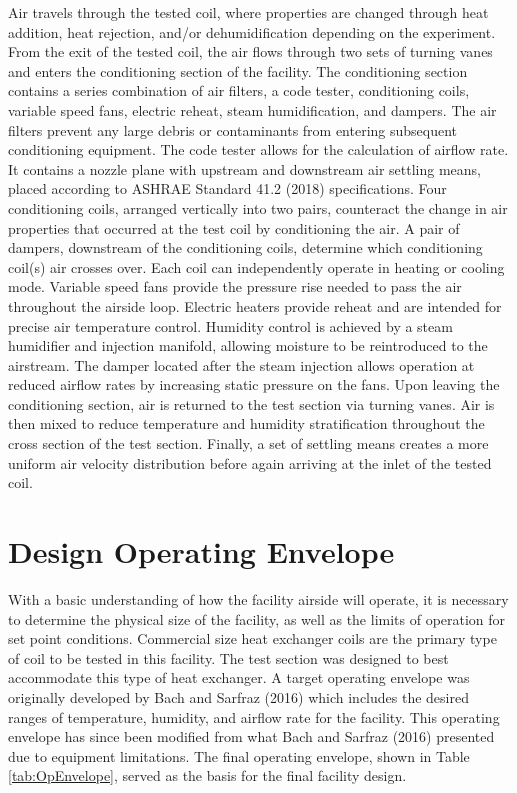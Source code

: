 Air travels through the tested coil, where properties are changed through heat addition, heat rejection, and/or dehumidification depending on the experiment. From the exit of the tested coil, the air flows through two sets of turning vanes and enters the conditioning section of the facility. The conditioning section contains a series combination of air filters, a code tester, conditioning coils, variable speed fans, electric reheat, steam humidification, and dampers. The air filters prevent any large debris or contaminants from entering subsequent conditioning equipment. The code tester allows for the calculation of airflow rate. It contains a nozzle plane with upstream and downstream air settling means, placed according to ASHRAE Standard 41.2 (2018) specifications. Four conditioning coils, arranged vertically into two pairs, counteract the change in air properties that occurred at the test coil by conditioning the air. A pair of dampers, downstream of the conditioning coils, determine which conditioning coil(s) air crosses over. Each coil can independently operate in heating or cooling mode. Variable speed fans provide the pressure rise needed to pass the air throughout the airside loop. Electric heaters provide reheat and are intended for precise air temperature control. Humidity control is achieved by a steam humidifier and injection manifold, allowing moisture to be reintroduced to the airstream. The damper located after the steam injection allows operation at reduced airflow rates by increasing static pressure on the fans. Upon leaving the conditioning section, air is returned to the test section via turning vanes. Air is then mixed to reduce temperature and humidity stratification throughout the cross section of the test section. Finally, a set of settling means creates a more uniform air velocity distribution before again arriving at the inlet of the tested coil.

\section{Design Operating Envelope}
\label{sec: Design Operating Envelope}

With a basic understanding of how the facility airside will operate, it is necessary to determine the physical size of the facility, as well as the limits of operation for set point conditions. Commercial size heat exchanger coils are the primary type of coil to be tested in this facility. The test section was designed to best accommodate this type of heat exchanger. A target operating envelope was originally developed by Bach and Sarfraz (2016) which includes the desired ranges of temperature, humidity, and airflow rate for the facility. This operating envelope has since been modified from what Bach and Sarfraz (2016) presented due to equipment limitations. The final operating envelope, shown in Table \ref{tab:OpEnvelope}, served as the basis for the final facility design.

